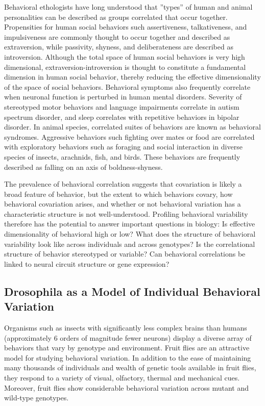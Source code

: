\documentclass[12pt,letterpaper]{article}
\begin{document}
Behavioral ethologists have long understood that ”types” of human and animal personalities can be described as groups correlated that occur together. Propensities for human social behaviors such assertiveness, talkativeness, and impulsiveness are commonly thought to occur together and described as extraversion, while passivity, shyness, and deliberateness are described as introversion. Although the total space of human social behaviors is very high dimensional, extraversion-introversion is thought to constitute a fundamental dimension in human social behavior, thereby reducing the effective dimensionality of the space of social behaviors. Behavioral symptoms also frequently correlate when neuronal function is perturbed in human mental disorders. Severity of stereotyped motor behaviors and language impairments correlate in autism spectrum disorder, and sleep correlates with repetitive behaviors in bipolar disorder. In animal species, correlated suites of behaviors are known as behavioral syndromes. Aggressive behaviors such fighting over mates or food are correlated with exploratory behaviors such as foraging and social interaction in diverse species of insects, arachnids, fish, and birds. These behaviors are frequently described as falling on an axis of boldness-shyness. 

The prevalence of behavioral correlation suggests that covariation is likely a broad feature of behavior, but the extent to which behaviors covary, how behavioral covariation arises, and whether or not behavioral variation has a characteristic structure is not well-understood. Profiling behavioral variability therefore has the potential to answer important questions in biology: Is effective dimensionality of behavioral high or low? What does the structure of behavioral variability look like across individuals and across genotypes? Is the correlational structure of behavior stereotyped or variable? Can behavioral correlations be linked to neural circuit structure or gene expression?

\subsection{Drosophila as a Model of Individual Behavioral Variation}

Organisms such as insects with significantly less complex brains than humans (approximately 6 orders of magnitude fewer neurons) display a diverse array of behaviors that vary by genotype and environment. Fruit flies are an attractive model for studying behavioral variation. In addition to the ease of maintaining many thousands of individuals and wealth of genetic tools available in fruit flies, they respond to a variety of visual, olfactory, thermal and mechanical cues. Moreover, fruit flies show considerable behavioral variation across mutant and wild-type genotypes.
\end{document}

